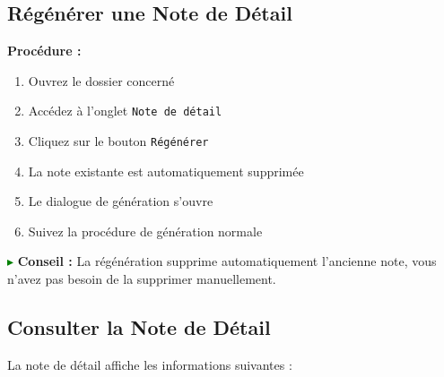 \documentclass[12pt,a4paper]{report}
\begin{document}
\subsection{Régénérer une Note de Détail}

\textbf{Procédure :}

\begin{enumerate}[leftmargin=*]
    \item Ouvrez le dossier concerné
    \item Accédez à l'onglet \texttt{Note de détail}
    \item Cliquez sur le bouton \texttt{Régénérer}
    \item La note existante est automatiquement supprimée
    \item Le dialogue de génération s'ouvre
    \item Suivez la procédure de génération normale
\end{enumerate}

\textcolor{green}{$\blacktriangleright$} \textbf{Conseil :} La régénération supprime automatiquement l'ancienne note, vous n'avez pas besoin de la supprimer manuellement.

\subsection{Consulter la Note de Détail}

La note de détail affiche les informations suivantes :
\end{document}
